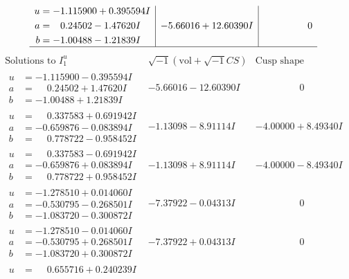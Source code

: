 \documentclass[1p]{elsarticle_modified}
\theoremstyle{definition}
\newcommand{\I}{\sqrt{-1}}
\begin{document}
$$\begin{array}{c|c|c}
\begin{aligned}
u &= -1.115900 + 0.395594 I \\
a &= \phantom{-}0.24502 - 1.47620 I \\
b &= -1.00488 - 1.21839 I\end{aligned}
 & -5.66016 + 12.60390 I & \phantom{-0.000000 } 0\\
 \hline 
 \end{array}$$\newpage$$\begin{array}{c|c|c}  
\text{Solutions to }I^u_{1}& \I (\text{vol} + \sqrt{-1}CS) & \text{Cusp shape}\\
 \hline 
\begin{aligned}
u &= -1.115900 - 0.395594 I \\
a &= \phantom{-}0.24502 + 1.47620 I \\
b &= -1.00488 + 1.21839 I\end{aligned}
 & -5.66016 - 12.60390 I & \phantom{-0.000000 } 0 \\ \hline\begin{aligned}
u &= \phantom{-}0.337583 + 0.691942 I \\
a &= -0.659876 - 0.083894 I \\
b &= \phantom{-}0.778722 - 0.958452 I\end{aligned}
 & -1.13098 - 8.91114 I & -4.00000 + 8.49340 I \\ \hline\begin{aligned}
u &= \phantom{-}0.337583 - 0.691942 I \\
a &= -0.659876 + 0.083894 I \\
b &= \phantom{-}0.778722 + 0.958452 I\end{aligned}
 & -1.13098 + 8.91114 I & -4.00000 - 8.49340 I \\ \hline\begin{aligned}
u &= -1.278510 + 0.014060 I \\
a &= -0.530795 - 0.268501 I \\
b &= -1.083720 - 0.300872 I\end{aligned}
 & -7.37922 - 0.04313 I & \phantom{-0.000000 } 0 \\ \hline\begin{aligned}
u &= -1.278510 - 0.014060 I \\
a &= -0.530795 + 0.268501 I \\
b &= -1.083720 + 0.300872 I\end{aligned}
 & -7.37922 + 0.04313 I & \phantom{-0.000000 } 0 \\ \hline\begin{aligned}
u &= \phantom{-}0.655716 + 0.240239 I \\

\end{aligned}
\end{array}$$
\end{document}
